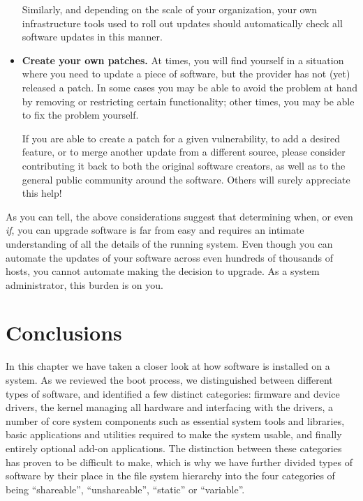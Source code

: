 \begin{itemize}
		Similarly, and depending on the scale of your
		organization, your own infrastructure tools used to roll
		out updates should automatically check all software
		updates in this manner.

	\item {\bf Create your own patches.}  At times, you will find
		yourself in a situation where you need to update a piece
		of software, but the provider has not (yet) released a
		patch.  In some cases you may be able to avoid the problem
		at hand by removing or restricting certain functionality;
		other times, you may be able to fix the problem yourself.

		If you are able to create a patch for a given
		vulnerability, to add a desired feature, or to merge
		another update from a different source, please consider
		contributing it back to both the original software
		creators, as well as to the general public community
		around the software.  Others will surely appreciate this
		help!
\end{itemize}

As you can tell, the above considerations suggest that
determining when, or even {\em if}, you can upgrade
software is far from easy and requires an intimate
understanding of all the details of the running
system.  Even though you can automate the updates of
your software across even hundreds of thousands of
hosts, you cannot automate making the decision to
upgrade.  As a system administrator, this burden is on
you.


\section{Conclusions}
\label{software-installation:conclusions}

In this chapter we have taken a closer look at how
software is installed on a system.  As we reviewed the
boot process, we distinguished between different types
of software, and identified a few distinct categories:
firmware and device drivers, the kernel managing all
hardware and interfacing with the drivers, a number of
core system components such as essential system tools
and libraries, basic applications and utilities
required to make the system usable, and finally
entirely optional add-on applications.  The
distinction between these categories has proven to be
difficult to make, which is why we have further
divided types of software by their place in the file
system hierarchy into the four categories of being
``shareable'', ``unshareable'', ``static'' or
``variable''.

